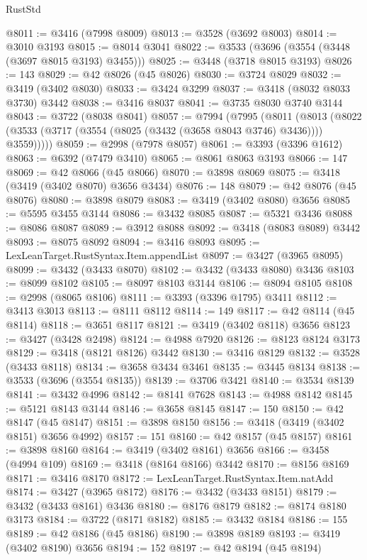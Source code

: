 \begin{lexlean}{RustStd}
\begin{coremodule}
@8011 := @3416 (@7998 @8009)
@8013 := @3528 (@3692 @8003)
@8014 := @3010 @3193
@8015 := @8014 @3041
@8022 := @3533 (@3696 (@3554 (@3448 (@3697 @8015 @3193) @3455)))
@8025 := @3448 (@3718 @8015 @3193)
@8026 := 143
@8029 := @42 @8026 (@45 @8026)
@8030 := @3724 @8029
@8032 := @3419 (@3402 @8030)
@8033 := @3424 @3299
@8037 := @3418 (@8032 @8033 @3730) @3442
@8038 := @3416 @8037
@8041 := @3735 @8030 @3740 @3144
@8043 := @3722 (@8038 @8041)
@8057 := @7994
    (@7995
      (@8011
        (@8013 (@8022 (@3533 (@3717 (@3554 (@8025 (@3432 (@3658 @8043 @3746) @3436)))) @3559)))))
@8059 := @2998 (@7978 @8057)
@8061 := @3393 (@3396 @1612)
@8063 := @6392 (@7479 @3410)
@8065 := @8061 @8063 @3193
@8066 := 147
@8069 := @42 @8066 (@45 @8066)
@8070 := @3898 @8069
@8075 := @3418 (@3419 (@3402 @8070) @3656 @3434)
@8076 := 148
@8079 := @42 @8076 (@45 @8076)
@8080 := @3898 @8079
@8083 := @3419 (@3402 @8080) @3656
@8085 := @5595 @3455 @3144
@8086 := @3432 @8085
@8087 := @5321 @3436
@8088 := @8086 @8087
@8089 := @3912 @8088
@8092 := @3418 (@8083 @8089) @3442
@8093 := @8075 @8092
@8094 := @3416 @8093
@8095 := LexLeanTarget.RustSyntax.Item.appendList
@8097 := @3427 (@3965 @8095)
@8099 := @3432 (@3433 @8070)
@8102 := @3432 (@3433 @8080) @3436
@8103 := @8099 @8102
@8105 := @8097 @8103 @3144
@8106 := @8094 @8105
@8108 := @2998 (@8065 @8106)
@8111 := @3393 (@3396 @1795) @3411
@8112 := @3413 @3013
@8113 := @8111 @8112
@8114 := 149
@8117 := @42 @8114 (@45 @8114)
@8118 := @3651 @8117
@8121 := @3419 (@3402 @8118) @3656
@8123 := @3427 (@3428 @2498)
@8124 := @4988 @7920
@8126 := @8123 @8124 @3173
@8129 := @3418 (@8121 @8126) @3442
@8130 := @3416 @8129
@8132 := @3528 (@3433 @8118)
@8134 := @3658 @3434 @3461
@8135 := @3445 @8134
@8138 := @3533 (@3696 (@3554 @8135))
@8139 := @3706 @3421
@8140 := @3534 @8139
@8141 := @3432 @4996
@8142 := @8141 @7628
@8143 := @4988 @8142
@8145 := @5121 @8143 @3144
@8146 := @3658 @8145
@8147 := 150
@8150 := @42 @8147 (@45 @8147)
@8151 := @3898 @8150
@8156 := @3418 (@3419 (@3402 @8151) @3656 @4992)
@8157 := 151
@8160 := @42 @8157 (@45 @8157)
@8161 := @3898 @8160
@8164 := @3419 (@3402 @8161) @3656
@8166 := @3458 (@4994 @109)
@8169 := @3418 (@8164 @8166) @3442
@8170 := @8156 @8169
@8171 := @3416 @8170
@8172 := LexLeanTarget.RustSyntax.Item.natAdd
@8174 := @3427 (@3965 @8172)
@8176 := @3432 (@3433 @8151)
@8179 := @3432 (@3433 @8161) @3436
@8180 := @8176 @8179
@8182 := @8174 @8180 @3173
@8184 := @3722 (@8171 @8182)
@8185 := @3432 @8184
@8186 := 155
@8189 := @42 @8186 (@45 @8186)
@8190 := @3898 @8189
@8193 := @3419 (@3402 @8190) @3656
@8194 := 152
@8197 := @42 @8194 (@45 @8194)

\end{coremodule}
\end{lexlean}
